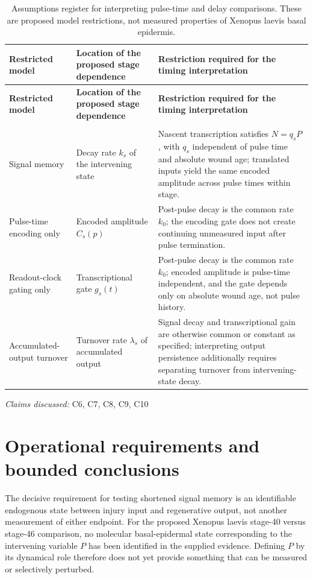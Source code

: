 \documentclass[11pt]{article}
\begin{document}
\begin{longtable}{@{}>{\raggedright\arraybackslash}p{}>{\raggedright\arraybackslash}p{}>{\raggedright\arraybackslash}p{}@{}}
\caption{Assumptions register for interpreting pulse-time and delay comparisons. These are proposed model restrictions, not measured properties of Xenopus laevis basal epidermis.}\\
\toprule
\textbf{Restricted model} & \textbf{Location of the proposed stage dependence} & \textbf{Restriction required for the timing interpretation}\\
\midrule
\endfirsthead
\toprule
\textbf{Restricted model} & \textbf{Location of the proposed stage dependence} & \textbf{Restriction required for the timing interpretation}\\
\midrule
\endhead
\midrule
\multicolumn{3}{r}{\footnotesize Continued on next page}\\
\endfoot
\bottomrule
\endlastfoot
Signal memory & Decay rate $k_s$ of the intervening state & Nascent transcription satisfies $N=q_sP$, with $q_s$ independent of pulse time and absolute wound age; translated inputs yield the same encoded amplitude across pulse times within stage.\\
Pulse-time encoding only & Encoded amplitude $C_s(p)$ & Post-pulse decay is the common rate $k_0$; the encoding gate does not create continuing unmeasured input after pulse termination.\\
Readout-clock gating only & Transcriptional gate $g_s(t)$ & Post-pulse decay is the common rate $k_0$; encoded amplitude is pulse-time independent, and the gate depends only on absolute wound age, not pulse history.\\
Accumulated-output turnover & Turnover rate $\lambda_s$ of accumulated output & Signal decay and transcriptional gain are otherwise common or constant as specified; interpreting output persistence additionally requires separating turnover from intervening-state decay.\\
\end{longtable}
\par{}
\textit{Claims discussed: }C6, C7, C8, C9, C10
\section{Operational requirements and bounded conclusions}
The decisive requirement for testing shortened signal memory is an identifiable endogenous state between injury input and regenerative output, not another measurement of either endpoint. For the proposed Xenopus laevis stage-40 versus stage-46 comparison, no molecular basal-epidermal state corresponding to the intervening variable $P$ has been identified in the supplied evidence. Defining $P$ by its dynamical role therefore does not yet provide something that can be measured or selectively perturbed.
\end{document}
